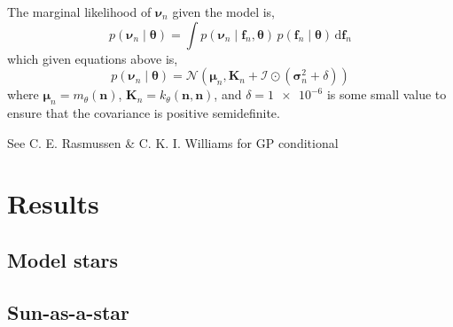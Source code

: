 \documentclass[linenumbers,modern]{aastex631}
\newcommand{\npred}{n_{\star}}
\newcommand{\dd}{\mathrm{d}}
\begin{document}
The marginal likelihood of \(\bm\nu_n\) given the model is,
%
\begin{equation}
    p(\bm\nu_n \mid \bm\theta) = \int p(\bm\nu_n \mid \bm f_n, \bm\theta) \,
    p(\bm f_n \mid \bm\theta) \, \dd \bm f_n
\end{equation}
%
which given equations above is,
%
\begin{equation}
    p(\bm\nu_n \mid \bm\theta) =
    \mathcal{N}\left( 
        \bm\mu_n, \bm K_n + \bm{\mathcal{I}} \odot (\bm\sigma_n^2 + \delta)
    \right)
\end{equation}
%
where \(\bm\mu_n = m_\theta(\bm n)\), \(\bm K_n = k_\theta(\bm n, \bm n)\), and
\(\delta = \num{1e-6}\) is some small value to ensure that the covariance is
positive semidefinite.

See C. E. Rasmussen \& C. K. I. Williams for GP conditional

\section{Results} \label{sec:results}



\subsection{Model stars} \label{sec:model-stars}



\subsection{Sun-as-a-star} \label{sec:sun}
\end{document}
